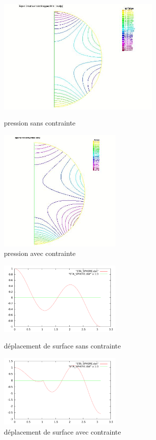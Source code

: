 \documentclass[a4paper]{report}
\begin{document}
\begin{figure}
\begin{minipage}[h!]{0.5\linewidth}
\centering
\includegraphics[width=8cm]{2_3_1_pression.jpeg}
\caption{pression sans contrainte }
\end{minipage}
\begin{minipage}[h!]{0.5\linewidth}
\centering
\includegraphics[width=6cm]{2_3_2_pression.jpeg}
\caption{pression avec contrainte}
\end{minipage}
\end{figure}
\begin{figure}
\begin{minipage}[h!]{0.5\linewidth}
\centering
\includegraphics[width=6cm]{2_3_1_ETA_SPHERE.pdf}
\caption{déplacement de surface sans contrainte }
\end{minipage}
\begin{minipage}[h!]{0.5\linewidth}
\centering
\includegraphics[width=6cm]{2_3_2_ETA_SPHERE.pdf}
\caption{déplacement de surface avec contrainte}
\end{minipage}
\end{figure}
\end{document}
